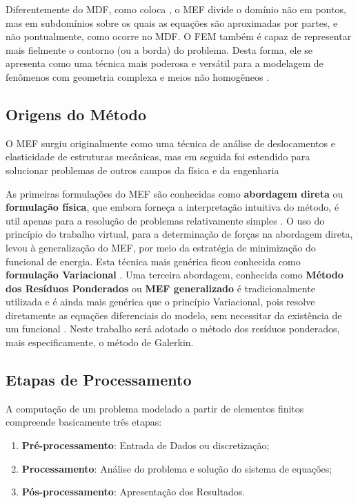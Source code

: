 \documentclass[
    12pt,               %
    openright,          %
    oneside,
    a4paper,            %
    english,            %
    french,             %
    spanish,            %
    brazil              %
    ]{abntex2}
\begin{document}
Diferentemente do MDF, como coloca \cite[p. 4]{huebner}, o MEF divide o domínio não em pontos, mas em subdomínios sobre os quais as equações são aproximadas por partes, e não pontualmente, como ocorre no MDF. O FEM também é capaz de representar mais fielmente o contorno (ou a borda) do problema. Desta forma, ele se apresenta como uma técnica mais poderosa e versátil para a modelagem de fenômenos com geometria complexa e meios não homogêneos \cite[p. 390]{sadiku}. 


\subsection{Origens do Método}

O MEF surgiu originalmente como uma técnica de análise de deslocamentos e elasticidade de estruturas mecânicas, mas em seguida foi estendido para solucionar problemas de outros campos da física e da engenharia \cite[p. 19]{jin} \cite[p. 3]{desai} \cite[p. 2]{zien}

As primeiras formulações do MEF são conhecidas como \textbf{abordagem direta} ou \textbf{formulação física}, que embora forneça a interpretação intuitiva do método, é util apenas para a resolução de problemas relativamente simples \cite[p. 6]{huebner}. O uso do princípio do trabalho virtual, para a determinação de forças na abordagem direta, levou à generalização do MEF, por meio da estratégia de minimização do funcional de energia. Esta técnica mais genérica  ficou conhecida como \textbf{formulação Variacional} \cite[p. 113]{desai} \cite[p. 20]{zien}. Uma terceira abordagem, conhecida como \textbf{Método dos Resíduos Ponderados} ou \textbf{MEF generalizado} \cite[p. 61]{zien} é tradicionalmente utilizada e é ainda mais genérica que o princípio Variacional, pois resolve diretamente as equações diferenciais do modelo, sem necessitar da existência de um funcional \cite[p. 261]{desai}. Neste trabalho será adotado o método dos resíduos ponderados, mais especificamente, o método de Galerkin.







\subsection{Etapas de Processamento}
A computação de um problema modelado a partir de elementos finitos compreende basicamente três etapas: 
\begin{enumerate}  
\item \textbf{Pré-processamento}: Entrada de Dados ou discretização;
\item \textbf{Processamento}: Análise do problema e  solução do sistema de equações;
\item \textbf{Pós-processamento}: Apresentação dos Resultados. 
\end{enumerate}
\end{document}
